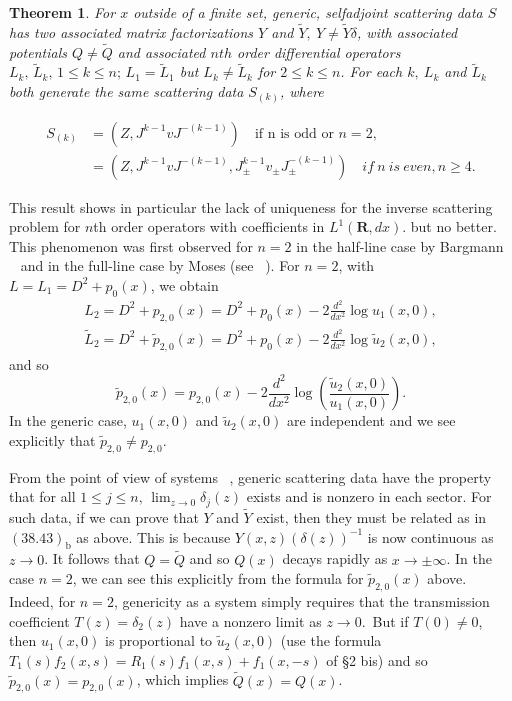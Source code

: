 \documentclass{surv-l}
\theoremstyle{plain}
\newtheorem{theorem}{Theorem}[section]
\theoremstyle{definition}
\numberwithin{equation}{chapter}
\begin{document}
\setcounter{theorem}{43}
\begin{theorem}\label{thm38.44} For $x$ outside of a finite set, generic, selfadjoint scattering data $S$ has two associated matrix factorizations $Y$ and $\tilde{Y},\  Y\neq\tilde{Y}\delta$, with associated potentials $Q\neq\tilde{Q}$ and associated $nth$ order differential operators $L_{k},\, \tilde{L}_{k},\, 1\leq k\leq n\mathrm{;}\, L_{1}=\tilde{L}_{1}$ but $L_{k}\neq\tilde{L}_{k}$ for $2\leq k\leq n$. For each $k,\ L_{k}$ and $\tilde{L}_{k}$ both generate the same scattering data $S_{(k)}$, where

\begin{align*}
S_{(k)}&= (Z, J^{k-1}vJ^{-(k-1)})\quad  \text{if n is odd or } n=2,\\
&=(Z,J^{k-1}vJ^{-(k-1)}, J_{\pm}^{k-1}v_{\pm} J_{\pm}^{-(k-1)})\quad if\ n\ is\ even, n\geq 4.
\end{align*}
\end{theorem}
This result shows in particular the lack of uniqueness for the inverse scattering problem for $n$th order operators with coefficients in $L^{1}(\mathbf{R}, dx)$. but no better. This phenomenon was first observed for $n=2$ in the half-line case by Bargmann ~\cite{Ba1,Ba2} and in the full-line case by Moses (see ~\cite{ADM, AN, Sa}). For $n=2$, with $L=L_{1}=D^{2}+p_{0}(x)$, we obtain
\begin{align*}
L_{2}=D^{2}+p_{2,0}(x)=D^{2}+p_{0}(x)-2\frac{d^{2}}{dx^{2}}\log u_{1}(x, 0),\\
\tilde{L}_{2}=D^{2}+\tilde{p}_{2,0}(x)=D^{2}+p_{0}(x)-2\frac{d^{2}}{dx^{2}}\log\tilde{u}_{2}(x, 0),
\end{align*}
and so
\begin{equation*}
\tilde{p}_{2,0}(x)=p_{2,0}(x)-2\frac{d^{2}}{dx^{2}}\log\left(\frac{\tilde{u}_{2}(x,0)}{u_{1}(x,0)}\right).
\end{equation*}
In the generic case, $u_{1}(x,0)$ and $\tilde{u}_{2}(x,0)$ are independent and we see explicitly that $\tilde{p}_{2,0}\neq p_{2,0}$.

From the point of view of systems ~\cite{BC1}, generic scattering data have the property that for all $1\leq j\leq n,\,\lim_{z\rightarrow 0}\delta_{j}(z)$ exists and is nonzero in each sector. For such data, if we can prove that $Y$ and $\tilde{Y}$ exist, then they must be related as in $(38.43)_{\mathrm{b}}$ as above. This is because $Y(x, z)(\delta(z))^{-1}$ is now continuous as $z\rightarrow 0$. It follows that $Q=\tilde{Q}$ and so $Q(x)$ decays rapidly as $ x\rightarrow\pm\infty$. In the case $n=2$, we can see this explicitly from the formula for $\tilde{p}_{2,0}(x)$ above. Indeed, for $n=2$, genericity as a system simply requires that the transmission coefficient $T(z)=\delta_{2}(z)$ have a nonzero limit as $z\rightarrow 0$.\ But if $T(0)\neq 0$, then $u_{1}(x, 0)$ is proportional to $\tilde{u}_{2} (x, 0)$ (use the formula $T_{1}(s)f_{2}(x, s)=R_{1}(s)f_{1}(x, s)+f_{1}(x,-s)$ of \S 2 bis) and so $\tilde{p}_{2,0}(x)=p_{2,0}(x)$, which implies $\tilde{Q}(x)=Q(x)$.
\end{document}

